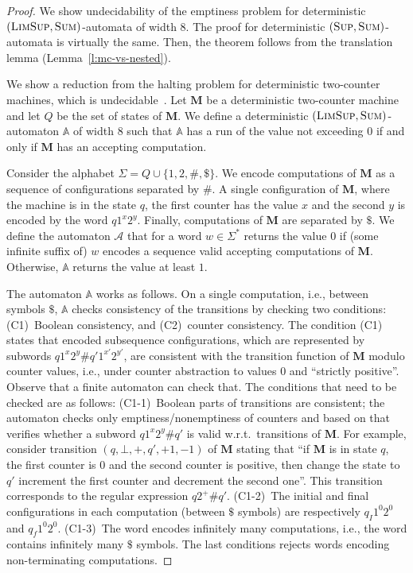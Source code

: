 \documentclass{lmcs}
\newcommand{\nestedA}{\mathbb{A}}
\newcommand{\fsum}{\textsc{Sum}}
\newcommand{\flimsup}{\textsc{LimSup}}
\newcommand{\fsup}{\textsc{Sup}}
\newcommand{\aut}{\mathcal{A}}
\newcommand{\M}{\mathbf{M}}
\begin{document}
\begin{proof}
We show undecidability of the emptiness problem for  deterministic $(\flimsup,\fsum)$-automata of width $8$.
The proof for deterministic $(\fsup,\fsum)$-automata is virtually the same.
Then, the theorem follows from the translation lemma (Lemma~\ref{l:mc-vs-nested}).


We show a reduction from the halting problem for deterministic two-counter machines, which is undecidable~\cite{minsky1961recursive}.
Let $\M$ be a deterministic two-counter machine and let $Q$ be the set of states of $\M$.
We define a deterministic $(\flimsup,\fsum)$-automaton $\nestedA$ of width $8$ such that
$\nestedA$ has a run of the value not exceeding $0$ if and only if $\M$ has an accepting computation.

Consider the alphabet $\Sigma = Q \cup \{ 1,2,\#,\$\}$.
We encode computations of $\M$ as a sequence of configurations separated by $\#$.
A single configuration of $\M$, where the machine is in the state $q$, the first counter has the value
$x$ and the second $y$ is encoded by the word $q 1^{x} 2^{y}$. Finally,
computations of $\M$ are separated by $\$$. We define the automaton $\aut$ that for a word $w \in \Sigma^*$ returns the value $0$ if (some infinite suffix of) $w$ encodes a sequence valid accepting computations of $\M$.
Otherwise, $\nestedA$ returns the value at least $1$.

The automaton $\nestedA$ works as follows. On a single computation, i.e., between symbols $\$$,  $\nestedA$ checks consistency of the transitions by checking two conditions: (C1)~Boolean consistency, and (C2)~counter consistency.
The condition (C1) states that encoded subsequence configurations, which are represented by subwords  $q 1^x 2^y \# q' 1^{x'} 2^{y'}$,
 are consistent with the transition function of $\M$ modulo counter values, i.e., under counter abstraction to values $0$ and ``strictly positive''.
Observe that a finite automaton can check that. The conditions that need to be checked are as follows:
(C1-1)~Boolean parts of transitions are consistent; the automaton checks only emptiness/nonemptiness of counters and based on that verifies whether a subword $q 1^x 2^y \# q'$ is valid w.r.t.\ transitions of $\M$.
For example, consider transition $(q,\bot, +, q', +1, -1)$ of $\M$ stating that ``if $\M$ is in state $q$, the first counter
is $0$ and the second counter is positive, then change the state to $q'$ increment the first counter and
decrement the second one''. This transition corresponds to the regular expression
$q 2^+ \# q'$.
(C1-2)~The initial and final configurations in each computation (between $\$$ symbols) are respectively $q_I 1^0 2^0$ and $q_f 1^0 2^0$.
(C1-3)~The word encodes infinitely many computations, i.e., the word contains infinitely many $\$$ symbols. The last conditions rejects words encoding non-terminating computations.


\end{proof}
\end{document}
